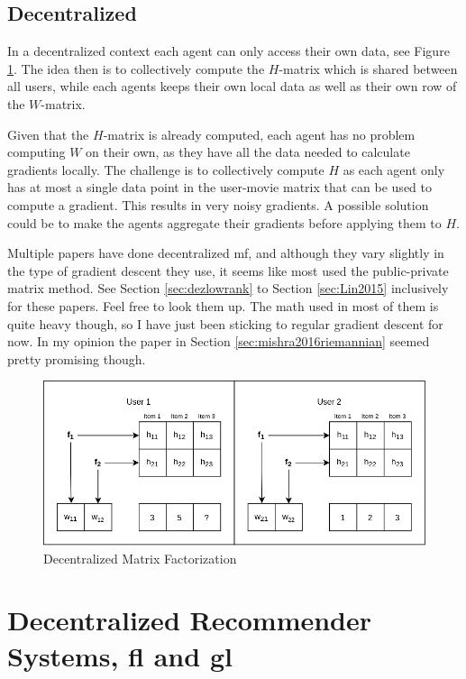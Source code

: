 \subsection{Decentralized}

In a decentralized context each agent can only access their own data, see Figure \ref{fig:d-mf}. The idea then is to collectively compute the $H$-matrix which is shared between all users, while each agents keeps their own local data as well as their own row of the $W$-matrix.

Given that the $H$-matrix is already computed, each agent has no problem computing $W$ on their own, as they have all the data needed to calculate gradients locally. The challenge is to collectively compute $H$ as each agent only has at most a single data point in the user-movie matrix that can be used to compute a gradient. This results in very noisy gradients. A possible solution could be to make the agents aggregate their gradients before applying them to $H$.

Multiple papers have done decentralized \acrlong{mf}, and although they vary slightly in the type of gradient descent they use, it seems like most used the public-private matrix method. See Section \ref{sec:dezlowrank} to Section \ref{sec:Lin2015} inclusively for these papers. Feel free to look them up. The math used in most of them is quite heavy though, so I have just been sticking to regular gradient descent for now. In my opinion the paper in Section \ref{sec:mishra2016riemannian} seemed pretty promising though.

\begin{figure}
    \centering
    \includegraphics[width=\textwidth]{figures/d-mf.png}
    \caption{Decentralized Matrix Factorization}
    \label{fig:d-mf}
\end{figure}

\section{Decentralized Recommender Systems, \acrlong{fl} and \acrlong{gl}}


